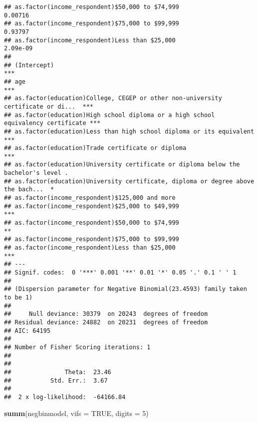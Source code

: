 \documentclass[
]{article}
\newenvironment{Shaded}{\begin{snugshade}}{\end{snugshade}}
\newcommand{\DataTypeTok}[1]{\textcolor[rgb]{0.13,0.29,0.53}{#1}}
\newcommand{\DecValTok}[1]{\textcolor[rgb]{0.00,0.00,0.81}{#1}}
\newcommand{\KeywordTok}[1]{\textcolor[rgb]{0.13,0.29,0.53}{\textbf{#1}}}
\newcommand{\NormalTok}[1]{#1}
\newcommand{\OtherTok}[1]{\textcolor[rgb]{0.56,0.35,0.01}{#1}}
\begin{document}
\begin{verbatim}
## as.factor(income_respondent)$50,000 to $74,999                                    0.00716
## as.factor(income_respondent)$75,000 to $99,999                                    0.93797
## as.factor(income_respondent)Less than $25,000                                    2.09e-09
##                                                                                     
## (Intercept)                                                                      ***
## age                                                                              ***
## as.factor(education)College, CEGEP or other non-university certificate or di...  ***
## as.factor(education)High school diploma or a high school equivalency certificate ***
## as.factor(education)Less than high school diploma or its equivalent              ***
## as.factor(education)Trade certificate or diploma                                 ***
## as.factor(education)University certificate or diploma below the bachelor's level .  
## as.factor(education)University certificate, diploma or degree above the bach...  *  
## as.factor(income_respondent)$125,000 and more                                       
## as.factor(income_respondent)$25,000 to $49,999                                   ***
## as.factor(income_respondent)$50,000 to $74,999                                   ** 
## as.factor(income_respondent)$75,000 to $99,999                                      
## as.factor(income_respondent)Less than $25,000                                    ***
## ---
## Signif. codes:  0 '***' 0.001 '**' 0.01 '*' 0.05 '.' 0.1 ' ' 1
## 
## (Dispersion parameter for Negative Binomial(23.4593) family taken to be 1)
## 
##     Null deviance: 30379  on 20243  degrees of freedom
## Residual deviance: 24882  on 20231  degrees of freedom
## AIC: 64195
## 
## Number of Fisher Scoring iterations: 1
## 
## 
##               Theta:  23.46 
##           Std. Err.:  3.67 
## 
##  2 x log-likelihood:  -64166.84
\end{verbatim}

\begin{Shaded}
\begin{Highlighting}[]
\KeywordTok{summ}\NormalTok{(negbinmodel, }\DataTypeTok{vifs =} \OtherTok{TRUE}\NormalTok{, }\DataTypeTok{digits =} \DecValTok{5}\NormalTok{)}
\end{Highlighting}
\end{Shaded}
\end{document}
